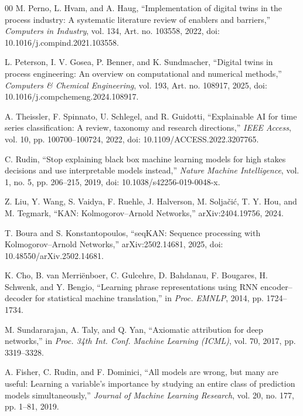 \documentclass[conference]{IEEEtran}
\begin{document}
\balance
\begin{thebibliography}{00}
 M. Perno, L. Hvam, and A. Haug, ``Implementation of digital twins in the process industry: A systematic literature review of enablers and barriers,'' \emph{Computers in Industry}, vol. 134, Art. no. 103558, 2022, doi: 10.1016/j.compind.2021.103558.

 L. Peterson, I. V. Gosea, P. Benner, and K. Sundmacher, ``Digital twins in process engineering: An overview on computational and numerical methods,'' \emph{Computers \& Chemical Engineering}, vol. 193, Art. no. 108917, 2025, doi: 10.1016/j.compchemeng.2024.108917.

 A. Theissler, F. Spinnato, U. Schlegel, and R. Guidotti, ``Explainable AI for time series classification: A review, taxonomy and research directions,'' \emph{IEEE Access}, vol. 10, pp. 100700--100724, 2022, doi: 10.1109/ACCESS.2022.3207765.

 C. Rudin, ``Stop explaining black box machine learning models for high stakes decisions and use interpretable models instead,'' \emph{Nature Machine Intelligence}, vol. 1, no. 5, pp. 206--215, 2019, doi: 10.1038/s42256-019-0048-x.

 Z. Liu, Y. Wang, S. Vaidya, F. Ruehle, J. Halverson, M. Solja\v{c}i\'c, T. Y. Hou, and M. Tegmark, ``KAN: Kolmogorov--Arnold Networks,'' arXiv:2404.19756, 2024.

 T. Boura and S. Konstantopoulos, ``seqKAN: Sequence processing with Kolmogorov--Arnold Networks,'' arXiv:2502.14681, 2025, doi: 10.48550/arXiv.2502.14681.

 K. Cho, B. van Merri\"enboer, C. Gulcehre, D. Bahdanau, F. Bougares, H. Schwenk, and Y. Bengio, ``Learning phrase representations using RNN encoder--decoder for statistical machine translation,'' in \emph{Proc. EMNLP}, 2014, pp. 1724--1734.

 M. Sundararajan, A. Taly, and Q. Yan, ``Axiomatic attribution for deep networks,'' in \emph{Proc. 34th Int. Conf. Machine Learning (ICML)}, vol. 70, 2017, pp. 3319--3328.

 A. Fisher, C. Rudin, and F. Dominici, ``All models are wrong, but many are useful: Learning a variable's importance by studying an entire class of prediction models simultaneously,'' \emph{Journal of Machine Learning Research}, vol. 20, no. 177, pp. 1--81, 2019.


\end{thebibliography}
\end{document}
